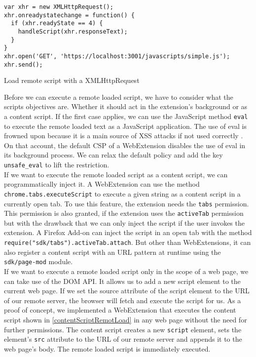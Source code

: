			\begin{code}
				\begin{lstlisting}
var xhr = new XMLHttpRequest();
xhr.onreadystatechange = function() {
  if (xhr.readyState == 4) {
    handleScript(xhr.responseText);
  }
}
xhr.open('GET', 'https://localhost:3001/javascripts/simple.js');
xhr.send();
				\end{lstlisting}
				\caption{Load remote script with a XMLHttpRequest}
				\label{xhrLoadScript}
			\end{code}
			
			Before we can execute a remote loaded script, we have to consider what the scripts objectives are. Whether it should act in the extension's background or as a content script. If the first case applies, we can use the JavaScript method \texttt{eval} to execute the remote loaded text as a JavaScript application. The use of eval is frowned upon because it is a main source of XSS attacks if not used correctly \cite{mozillaDangerousEval}. On that account, the default CSP of a WebExtension disables the use of eval in its background process. We can relax the default policy and add the key \texttt{unsafe\_eval} to lift the restriction. \\
			
			If we want to execute the remote loaded script as a content script, we can programmatically inject it. A WebExtension can use the method \texttt{chrome.tabs.executeScript} to execute a given string as a content script in a currently open tab. To use this feature, the extension needs the \texttt{tabs} permission. This permission is also granted, if the extension uses the \texttt{activeTab} permission but with the drawback that we can only inject the script if the user invokes the extension. A Firefox Add-on can inject the script in an open tab with the method \texttt{require("sdk/tabs").activeTab.attach}. But other than WebExtensions, it can also register a content script with an URL pattern at runtime using the \texttt{sdk/page-mod} module. \\
			
			If we want to execute a remote loaded script only in the scope of a web page, we can take use of the DOM API. It allows us to add a new script element to the current web page. If we set the source attribute of the script element to the URL of our remote server, the browser will fetch and execute the script for us. As a proof of concept, we  implemented a WebExtension that executes the content script shown in \autoref{contentScriptRemotLoad} in any web page without the need for further permissions. The content script creates a new \texttt{script} element, sets the element's \texttt{src} attribute to the URL of our remote server and appends it to the web page's body. The remote loaded script is immediately executed.
			
